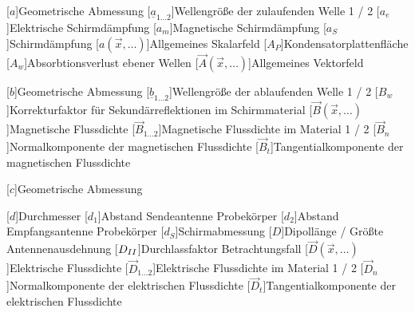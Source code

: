 \begin{acronym}[Platzhalterwort]

[$a$]{\acrounit{\meter}Geometrische Abmessung}
[$\underline{a}_{1\ldots2}$]{\acrounit{-}Wellengröße der zulaufenden Welle 1 / 2}
[$a_e$]{\acrounit{\Dezibel}Elektrische Schirmdämpfung}
[$a_m$]{\acrounit{\Dezibel}Magnetische Schirmdämpfung}
[$a_S$]{\acrounit{\Dezibel}Schirmdämpfung}
[$a(\vec x,\ldots)$]{\acrounit{-}Allgemeines Skalarfeld}
[$A_P$]{\acrounit{\square\meter}Kondensatorplattenfläche}
[$A_w$]{\acrounit{\Dezibel}Absorbtionsverlust ebener Wellen}
[$\vec A(\vec x,\ldots)$]{\acrounit{-}Allgemeines Vektorfeld}

[$b$]{\acrounit{\meter}Geometrische Abmessung}
[$\underline{b}_{1\ldots2}$]{\acrounit{-}Wellengröße der ablaufenden Welle 1 / 2}
[$B_w$]{\acrounit{\Dezibel}Korrekturfaktor für Sekundärreflektionen im Schirmmaterial}
[$\vec B(\vec x, \ldots)$]{\acrounit{\tesla}Magnetische Flussdichte}
[$\vec B_{1\ldots2}$]{\acrounit{\tesla}Magnetische Flussdichte im Material 1 / 2}
[$\vec B_n$]{\acrounit{\tesla}Normalkomponente der magnetischen Flussdichte}
[$\vec B_t$]{\acrounit{\tesla}Tangentialkomponente der magnetischen Flussdichte}

[$c$]{\acrounit{\meter}Geometrische Abmessung}

[$d$]{\acrounit{\meter}Durchmesser}
[$d_1$]{\acrounit{\meter}Abstand Sendeantenne Probekörper}
[$d_2$]{\acrounit{\meter}Abstand Empfangsantenne Probekörper}
[$d_S$]{\acrounit{\meter}Schirmabmessung}
[$D$]{\acrounit{\meter}Dipollänge / Größte Antennenausdehnung}
[$D_{\uproman{2}}$]{Durchlassfaktor Betrachtungsfall }
[$\vec D(\vec x, \ldots)$]{\acrounit{\ampere\second\per\square\meter}Elektrische Flussdichte}
[$\vec D_{1\ldots2}$]{\acrounit{\ampere\second\per\square\meter}Elektrische Flussdichte im Material 1 / 2}
[$\vec D_n$]{\acrounit{\ampere\second\per\square\meter}Normalkomponente der elektrischen Flussdichte}
[$\vec D_t$]{\acrounit{\ampere\second\per\square\meter}Tangentialkomponente der elektrischen Flussdichte}



\end{acronym}
